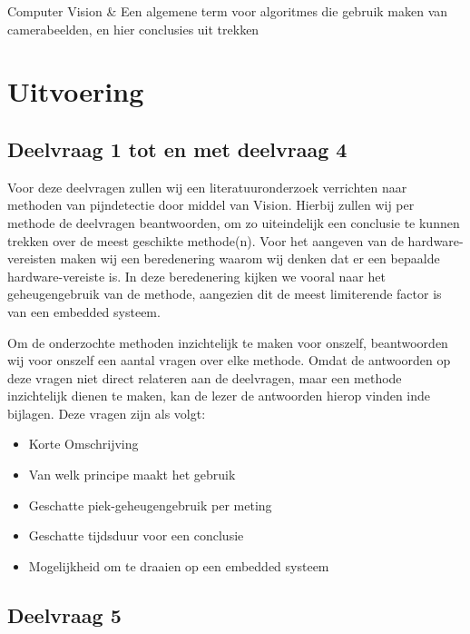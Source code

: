 \documentclass[11pt]{article}
\begin{document}
    \begin{definition}
        Computer Vision & Een algemene term voor algoritmes die gebruik maken van camerabeelden, en hier conclusies uit trekken\\

    \end{definition}


    \section{Uitvoering}\label{sec:uitvoering}

    \subsection{Deelvraag 1 tot en met deelvraag 4}\label{subsec:deelvraag-1-tot-en-met-deelvraag-4}
    Voor deze deelvragen zullen wij een literatuuronderzoek
    verrichten naar methoden van pijndetectie door middel van Vision.
    Hierbij zullen wij per methode de deelvragen beantwoorden, om zo uiteindelijk een conclusie te kunnen trekken over
    de meest geschikte methode(n).
    Voor het aangeven van de hardware-vereisten maken wij een beredenering waarom wij denken dat er een bepaalde hardware-vereiste is.
    In deze beredenering kijken we vooral naar het geheugengebruik van de methode,
    aangezien dit de meest limiterende factor is van een embedded systeem.

    Om de onderzochte methoden inzichtelijk te maken voor onszelf, beantwoorden wij voor onszelf een aantal vragen over elke methode.
    Omdat de antwoorden op deze vragen niet direct relateren aan de deelvragen, maar een methode inzichtelijk dienen te maken, kan de lezer de antwoorden hierop vinden inde bijlagen.
    Deze vragen zijn als volgt:
    \begin{itemize}
        \item Korte Omschrijving
        \item Van welk principe maakt het gebruik
        \item Geschatte piek-geheugengebruik per meting
        \item Geschatte tijdsduur voor een conclusie
        \item Mogelijkheid om te draaien op een embedded systeem
    \end{itemize}


    \subsection{Deelvraag 5}\label{subsec:uitvoering-deelvraag-5}
\end{document}
